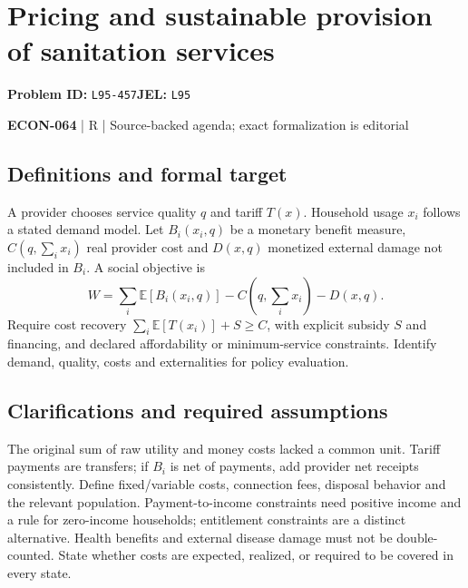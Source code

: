 \documentclass[11pt,a4paper]{article}
\begin{document}
\section*{Pricing and sustainable provision of sanitation services}
\textbf{Problem ID:} \texttt{L95-457}\quad \textbf{JEL:} \texttt{L95}\par
\label{problem:OP-0633}


\label{audited:ECON-064}

{\sffamily\small\color{muted}\textbf{ECON-064} | R | Source-backed agenda; exact formalization is editorial\par}

\subsection*{Definitions and formal target}

A provider chooses service quality \(q\) and tariff \(T(x)\). Household usage \(x_i\) follows a stated demand model. Let \(B_i(x_i,q)\) be a monetary benefit measure, \(C(q,\sum_i x_i)\) real provider cost and \(D(x,q)\) monetized external damage not included in \(B_i\). A social objective is
\[
 W=\sum_i\mathbb E[B_i(x_i,q)]-C(q,\textstyle\sum_i x_i)-D(x,q).
\]
Require cost recovery \(\sum_i\mathbb E[T(x_i)]+S\geq C\), with explicit subsidy \(S\) and financing, and declared affordability or minimum-service constraints. Identify demand, quality, costs and externalities for policy evaluation.

\subsection*{Clarifications and required assumptions}

The original sum of raw utility and money costs lacked a common unit. Tariff payments are transfers; if \(B_i\) is net of payments, add provider net receipts consistently. Define fixed/variable costs, connection fees, disposal behavior and the relevant population. Payment-to-income constraints need positive income and a rule for zero-income households; entitlement constraints are a distinct alternative. Health benefits and external disease damage must not be double-counted. State whether costs are expected, realized, or required to be covered in every state.
\end{document}
